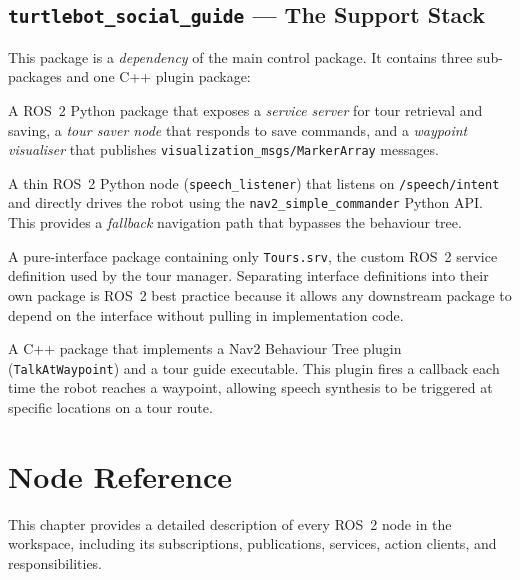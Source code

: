 \documentclass[12pt,a4paper]{report}
\newcommand{\pkg}[1]{\texttt{\color{RoyalBlue}#1}}
\newcommand{\topic}[1]{\texttt{\color{purple!80!black}#1}}
\newcommand{\file}[1]{\texttt{\color{black!70}#1}}
\newcommand{\node}[1]{\texttt{\color{Maroon}#1}}
\begin{document}
\section{\texttt{turtlebot\_social\_guide} — The Support Stack}
\label{sec:social_guide}

This package is a \emph{dependency} of the main control package.  It contains
three sub-packages and one C++ plugin package:

\begin{description}[leftmargin=2em, style=nextline]
  \item[\pkg{tour\_manager}]
    A ROS~2 Python package that exposes a \emph{service server} for tour
    retrieval and saving, a \emph{tour saver node} that responds to save
    commands, and a \emph{waypoint visualiser} that publishes
    \texttt{visualization\_msgs/MarkerArray} messages.

  \item[\pkg{speech\_locomotion\_interface}]
    A thin ROS~2 Python node (\node{speech\_listener}) that listens on
    \topic{/speech/intent} and directly drives the robot using the
    \texttt{nav2\_simple\_commander} Python API.  This provides a
    \emph{fallback} navigation path that bypasses the behaviour tree.

  \item[\pkg{social\_robot\_interfaces}]
    A pure-interface package containing only \file{Tours.srv}, the custom
    ROS~2 service definition used by the tour manager.  Separating interface
    definitions into their own package is ROS~2 best practice because it allows
    any downstream package to depend on the interface without pulling in
    implementation code.

  \item[\pkg{robot\_tour}]
    A C++ package that implements a Nav2 Behaviour Tree plugin
    (\texttt{TalkAtWaypoint}) and a tour guide executable.  This plugin fires
    a callback each time the robot reaches a waypoint, allowing speech
    synthesis to be triggered at specific locations on a tour route.
\end{description}

\chapter{Node Reference}
\label{ch:nodes}

This chapter provides a detailed description of every ROS~2 node in the
workspace, including its subscriptions, publications, services, action clients,
and responsibilities.
\end{document}
